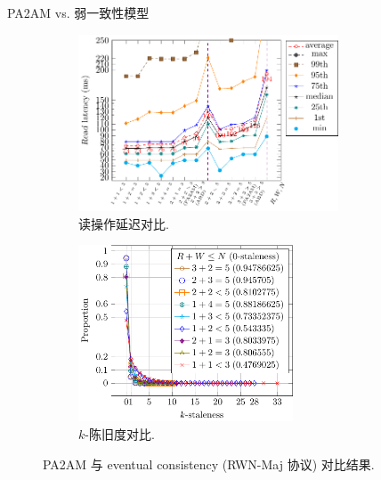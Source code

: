 \begin{frame}{PA2AM vs. 弱一致性模型}
  \begin{figure}
	\begin{subfigure}{0.50\textwidth}
	  \centering
	  \includegraphics[width = 0.85\textwidth]{figs/rwn-2am-read-latency-quantiles.pdf}
	  \caption{读操作延迟对比.}
	\end{subfigure}%
	\begin{subfigure}{0.50\textwidth}
	  \centering
	  \includegraphics[width = 0.70\textwidth]{figs/rwn-maj.pdf}
	  \caption{$k$-陈旧度对比.}
	\end{subfigure}
	\caption{PA2AM 与 eventual consistency (RWN-Maj 协议) 对比结果.}
  \end{figure}

  \vspace{-0.50cm}
  
\end{frame}
